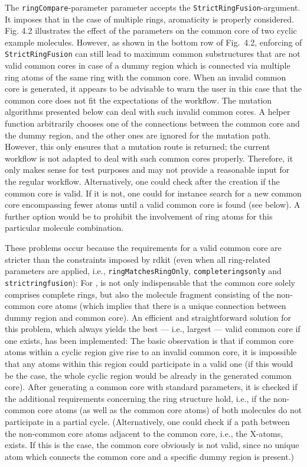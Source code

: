 The \texttt{ringCompare}-parameter parameter accepts the \texttt{StrictRingFusion}-argument.
It imposes that in the case of multiple rings, aromaticity is properly
considered. Fig. 4.2 illustrates the effect of the parameters
on the common core of two cyclic example molecules. However, as shown in the bottom row of Fig.~4.2, enforcing
of \texttt{StrictRingFusion} can still lead to maximum common substructures
that are not valid {\trafo} common cores in case of a dummy region
which is connected via multiple ring atoms of the same ring with the common
core. 
When an invalid common core is generated, it appears to be advisable to warn the user in this case that the common core does not fit the expectations of the {\trafo} workflow. 
The mutation algorithms presented below can deal with such invalid common cores. A helper function arbitrarily chooses one of the connections between the common core and the dummy region, and the other ones are ignored for the mutation path. However, this only ensures that a mutation route is returned; the current {\trafo} workflow is not adapted to deal with such common cores properly. Therefore, it only makes sense for test purposes and may not provide a reasonable input for the regular workflow.
Alternatively, one could check after the creation if the common core is valid. If
it is not, one could for instance search for a new common core encompassing fewer
atoms until a valid common core is found (see below). A further option would be to prohibit the involvement of ring atoms for this particular molecule combination.

These problems occur because the requirements for a valid {\trafo} common core are stricter than the constraints imposed by rdkit  (even when all ring-related parameters are applied, i.e., \texttt{ringMatchesRingOnly}, \texttt{completeringsonly} and \texttt{strictringfusion}): For {\trafo}, is not only indispensable that the common core solely comprises complete rings, but also the molecule fragment consisting of the non-common core atoms (which implies that there is a unique connection between dummy region and common core).
An efficient and straightforward solution for this problem, which always yields the best --- i.e., largest --- valid common core if one exists, has been implemented:
The basic observation is that if common core atoms within a cyclic region give rise to an invalid common core, it is impossible that any atoms within this region could participate in a valid one (if this would be the case, the whole cyclic region would be already in the generated common core).
After generating a common core with standard parameters, it is checked if the additional requirements concerning the ring structure hold, i.e., if the non-common core atoms (as well as the common core atoms) of both molecules do not participate in a partial cycle.
(Alternatively, one could check if a path between the non-common core atoms adjacent to the common core, i.e., the X-atoms, exists. If this is the case, the common core obviously is not valid, since no unique atom which connects the common core and a specific dummy region is present.)





